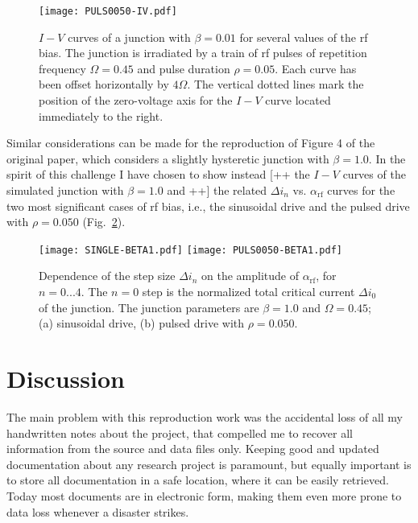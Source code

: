 \begin{figure}[tb]
	\centering
	\texttt{[image: PULS0050-IV.pdf]}
	\caption{$I - V$ curves of a junction with $\beta = 0.01$ for several values of the rf bias. The junction is  irradiated by a train of rf pulses of repetition frequency $\Omega = 0.45$ and pulse duration $\rho = 0.05$. Each curve has been offset horizontally by $4 \Omega$. The vertical dotted lines mark the position of the zero-voltage axis for the $I - V$ curve located immediately to the right.}
	\label{fig:pulsed-ivs}
\end{figure}


Similar considerations can be made for the reproduction of Figure 4 of the original paper, which considers a slightly hysteretic junction with $\beta = 1.0$. In the spirit of this challenge I have chosen to show instead [++ the $I - V$ curves of the simulated junction with $\beta = 1.0$ and ++] the related $\Delta i_n$ vs. $\alpha_\mathrm{rf}$ curves for the two most significant cases of rf bias, i.e., the sinusoidal drive and the pulsed drive with $\rho = 0.050$ (Fig.~\ref{fig:step-width-beta1}).

\begin{figure}[p]
	\centering
	\texttt{[image: SINGLE-BETA1.pdf]}
	\texttt{[image: PULS0050-BETA1.pdf]}
	\caption{Dependence of the step size $\Delta i_n$ on the amplitude of  $\alpha_\mathrm{rf}$, for $n = 0. . . 4$. The $n = 0$ step is the normalized total critical current $\Delta i_0$ of the junction. The junction parameters are $\beta = 1.0$ and $\Omega = 0. 45$; (a) sinusoidal drive, (b) pulsed drive with $\rho = 0. 050$.}
	\label{fig:step-width-beta1}
\end{figure}



\section{Discussion}

The main problem with this reproduction work was the accidental loss of all my handwritten notes about the project, that compelled me to recover all information from the source and data files only. 
Keeping good and updated documentation about any research project is paramount, but equally important is to store all documentation in a safe location, where it can be easily retrieved.
Today most documents are in electronic form, making them even more prone to data loss whenever a disaster strikes.

